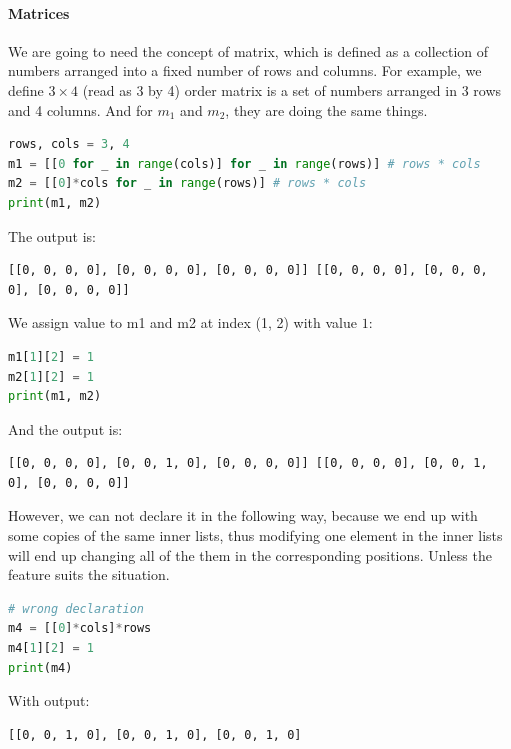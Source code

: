 \documentclass[../main.tex]{subfiles}
\begin{document}
\paragraph{Matrices} We are going to need the concept of matrix, which is defined as a collection of numbers arranged into a fixed number of rows and columns. For example, we define $3 \times  4$ (read as 3 by 4) order matrix is a set of numbers arranged in 3 rows and 4 columns. And for $m_1$ and $m_2$, they are doing the same things. 
\begin{lstlisting}[language=Python]
rows, cols = 3, 4
m1 = [[0 for _ in range(cols)] for _ in range(rows)] # rows * cols
m2 = [[0]*cols for _ in range(rows)] # rows * cols
print(m1, m2)
\end{lstlisting}
The output is:
\begin{lstlisting}[numbers=none]
[[0, 0, 0, 0], [0, 0, 0, 0], [0, 0, 0, 0]] [[0, 0, 0, 0], [0, 0, 0, 0], [0, 0, 0, 0]] 
\end{lstlisting}
We assign value to m1 and m2 at index (1, 2) with value $1$:
\begin{lstlisting}[language=Python]
m1[1][2] = 1
m2[1][2] = 1
print(m1, m2)
\end{lstlisting}
And the output is:
\begin{lstlisting}[numbers=none]
[[0, 0, 0, 0], [0, 0, 1, 0], [0, 0, 0, 0]] [[0, 0, 0, 0], [0, 0, 1, 0], [0, 0, 0, 0]]
\end{lstlisting}
However, we can not declare it in the following way, because we end up with some copies of the same inner lists, thus modifying one element in the inner lists will end up changing all of the them in the corresponding positions. Unless the feature suits the situation.
\begin{lstlisting}[language=Python]
# wrong declaration
m4 = [[0]*cols]*rows
m4[1][2] = 1
print(m4)
\end{lstlisting}
With output:
\begin{lstlisting}[numbers=none]
[[0, 0, 1, 0], [0, 0, 1, 0], [0, 0, 1, 0]
\end{lstlisting}
\end{document}

